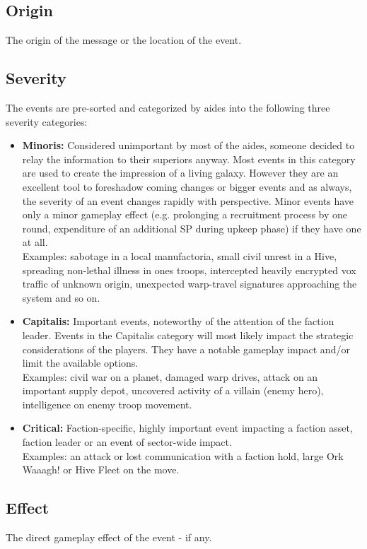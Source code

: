 \subsection{Origin}
The origin of the message or the location of the event.

\subsection{Severity}
The events are pre-sorted and categorized by aides into the following three severity categories:
\begin{itemize}
	\item \textbf{Minoris:} Considered unimportant by most of the aides, someone decided to relay the information to their superiors anyway. Most events in this category are used to create the impression of a living galaxy. However they are an excellent tool to foreshadow coming changes or bigger events and as always, the severity of an event changes rapidly with perspective. Minor events have only a minor gameplay effect (e.g. prolonging a recruitment process by one round, expenditure of an additional SP during upkeep phase) if they have one at all.\\
	Examples: sabotage in a local manufactoria, small civil unrest in a Hive, spreading non-lethal illness in ones troops, intercepted heavily encrypted vox traffic of unknown origin, unexpected warp-travel signatures approaching the system and so on.
	\item \textbf{Capitalis:} Important events, noteworthy of the attention of the faction leader. Events in the Capitalis category will most likely impact the strategic considerations of the players. They have a notable gameplay impact and/or limit the available options.\\
	Examples: civil war on a planet, damaged warp drives, attack on an important supply depot, uncovered activity of a villain (enemy hero), intelligence on enemy troop movement.
	\item \textbf{Critical:} Faction-specific, highly important event impacting a faction asset, faction leader or an event of sector-wide impact.\\
	Examples: an attack or lost communication with a faction hold, large Ork Waaagh! or Hive Fleet on the move.
\end{itemize}

\subsection{Effect}
The direct gameplay effect of the event - if any.

